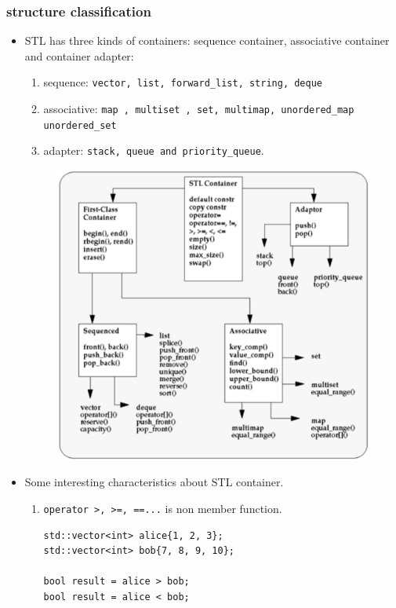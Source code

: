 \documentclass[a4paper,11pt,twoside]{book}
\begin{document}
\subsubsection{structure classification}
\begin{itemize}

\item STL has three kinds of containers: sequence container, associative container and container adapter:
\begin{enumerate}
\item sequence: \texttt{vector, list, forward\_list, string,  deque}
\item associative: \texttt{map , multiset , set, multimap, unordered\_map unordered\_set}
\item adapter: \texttt{stack, queue and priority\_queue}.
\end{enumerate}

\begin{figure}[ht]
	\centering
	\includegraphics[width=0.7\linewidth]{pics/container.png}
	\label{fig:constexpr}
\end{figure}

\item Some interesting characteristics about STL container.

\begin{enumerate}
	\item \texttt{operator >, >=, ==...} is non member function. 
\begin{lstlisting}
std::vector<int> alice{1, 2, 3};
std::vector<int> bob{7, 8, 9, 10};

bool result = alice > bob;
bool result = alice < bob;
\end{lstlisting}	


\end{enumerate}
\end{itemize}
\end{document}
